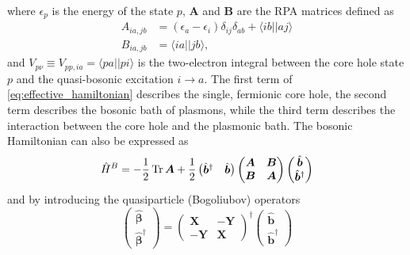 where $\epsilon_p$ is the energy of the state $p$, $\bm{A}$ and $\bm{B}$ are the RPA matrices defined as
\begin{align}
    A_{ia,jb} &= (\epsilon_a - \epsilon_i) \delta_{ij} \delta_{ab} + \langle i b || a j \rangle \\
    B_{ia,jb} &= \langle i a || j b \rangle,
\end{align}
 and $V_{p\nu}\equiv V_{pp,ia} = \langle p a || p i \rangle$ is the two-electron integral between the core hole state $p$ and the quasi-bosonic excitation $i\to a$.
The first term of \ref{eq:effective_hamiltonian} describes the single, fermionic core hole, the second term describes the bosonic bath of plasmons, while the third term describes the interaction between the core hole and the plasmonic bath. The bosonic Hamiltonian can also be expressed as 
\begin{equation}
    \hat{H}^B = -\frac{1}{2} \Tr \bm{A} + \frac{1}{2} \begin{pmatrix} \hat{\bm{b}}^\dagger & \hat{\bm{b}} \end{pmatrix} \begin{pmatrix} \bm{A} & \bm{B} \\ \bm{B} & \bm{A} \end{pmatrix} \begin{pmatrix} \hat{\bm{b}} \\ \hat{\bm{b}}^\dagger \end{pmatrix}
\end{equation}
and by introducing the quasiparticle (Bogoliubov) operators
\begin{equation}
    \begin{pmatrix}
\hat{\bm{\beta}} \\ \hat{\bm{\beta}}^\dagger
    \end{pmatrix}
= \begin{pmatrix}\bm{X} & -\bm{Y} \\ -\bm{Y} & \bm{X} \end{pmatrix}^\dagger \begin{pmatrix}\hat{\bm{b}} \\ \hat{\bm{b}}^\dagger \end{pmatrix}
\end{equation}
